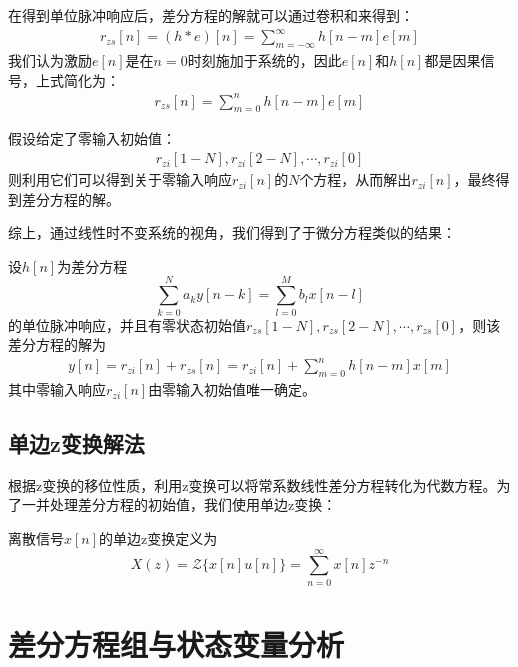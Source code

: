 \documentclass{ctexbook}
\begin{document}
在得到单位脉冲响应后，差分方程的解就可以通过卷积和来得到：
\begin{align*}
    r_{zs}[n]=(h*e)[n]=\sum_{m=-\infty}^{\infty}h[n-m]e[m]
\end{align*}
我们认为激励$e[n]$是在$n=0$时刻施加于系统的，因此$e[n]$和$h[n]$都是因果信号，上式简化为：
\begin{align*}
    r_{zs}[n]=\sum_{m=0}^{n}h[n-m]e[m]
\end{align*}

假设给定了零输入初始值：
\begin{align*}
    r_{zi}[1-N],r_{zi}[2-N],\cdots,r_{zi}[0]
\end{align*}
则利用它们可以得到关于零输入响应$r_{zi}[n]$的$N$个方程，从而解出$r_{zi}[n]$，最终得到差分方程的解。

综上，通过线性时不变系统的视角，我们得到了于微分方程类似的结果：
\begin{theorem}
    设$h[n]$为差分方程
    $$\sum_{k=0}^{N}a_k y[n-k] = \sum_{l=0}^{M}b_l x[n-l]$$
    的单位脉冲响应，并且有零状态初始值$r_{zs}[1-N],r_{zs}[2-N],\cdots,r_{zs}[0]$，则该差分方程的解为
    \begin{align*}
        y[n]=r_{zi}[n]+r_{zs}[n]=r_{zi}[n]+\sum_{m=0}^{n}h[n-m]x[m]
    \end{align*}
    其中零输入响应$r_{zi}[n]$由零输入初始值唯一确定。
\end{theorem}

\subsection{单边z变换解法}\label{sub:single_z}

根据z变换的移位性质，利用z变换可以将常系数线性差分方程转化为代数方程。为了一并处理差分方程的初始值，我们使用单边z变换：
\begin{definition}[单边z变换]
    离散信号$x[n]$的单边z变换定义为
    \[X(z)=\mathcal{Z}\{x[n]u[n]\}=\sum_{n=0}^{\infty}x[n]z^{-n}\]
\end{definition}


\section{差分方程组与状态变量分析}\label{sec:Difference_Equation}
\end{document}
